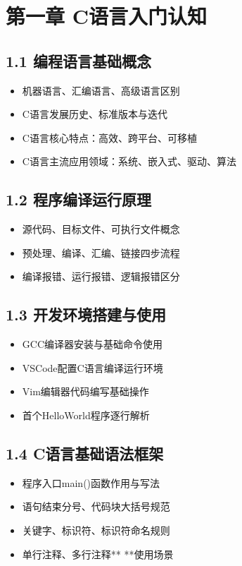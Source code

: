 
\section*{第一章 C语言入门认知}
\subsection*{1.1 编程语言基础概念}
\begin{itemize}
\item 机器语言、汇编语言、高级语言区别
\item C语言发展历史、标准版本与迭代
\item C语言核心特点：高效、跨平台、可移植
\item C语言主流应用领域：系统、嵌入式、驱动、算法
\end{itemize}

\subsection*{1.2 程序编译运行原理}
\begin{itemize}
\item 源代码、目标文件、可执行文件概念
\item 预处理、编译、汇编、链接四步流程
\item 编译报错、运行报错、逻辑报错区分
\end{itemize}

\subsection*{1.3 开发环境搭建与使用}
\begin{itemize}
\item GCC编译器安装与基础命令使用
\item VSCode配置C语言编译运行环境
\item Vim编辑器代码编写基础操作
\item 首个HelloWorld程序逐行解析
\end{itemize}

\subsection*{1.4 C语言基础语法框架}
\begin{itemize}
\item 程序入口main()函数作用与写法
\item 语句结束分号、代码块大括号规范
\item 关键字、标识符、标识符命名规则
\item 单行注释\/\/、多行注释\/** **\/使用场景
\end{itemize}


